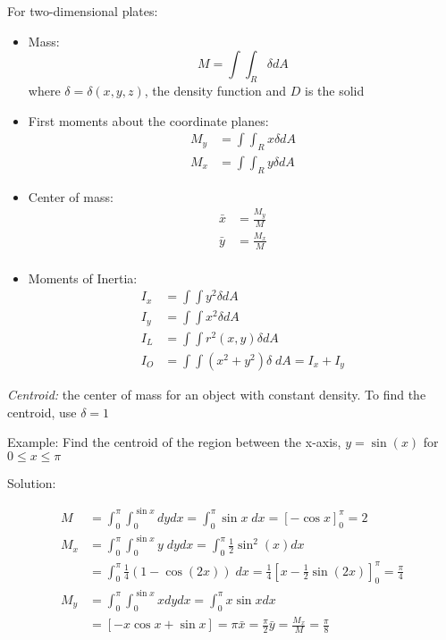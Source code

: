 \documentclass[12pt]{article}
\begin{document}
For two-dimensional plates:
\begin{itemize}
    \item Mass:
    \[M = \int \int_R \delta dA\]
    where $\delta = \delta(x,y,z)$, the density function and $D$ is the solid 
    \item First moments about the coordinate planes:
    \begin{align*}
        M_y &= \int \int_R x\delta dA\\
        M_x &= \int \int_R y \delta dA
    \end{align*}
    \item Center of mass:
    \begin{align*}
        \bar{x} &= \frac{M_y}{M}\\
        \bar{y} &= \frac{M_x}{M}\\
    \end{align*}
    \item Moments of Inertia:
    \begin{align*}
        I_x &= \int \int y^2 \delta dA\\
        I_y &= \int \int x^2 \delta dA\\
        I_L &= \int \int r^2(x,y) \delta dA\\
        I_O &= \int \int (x^2 + y^2) \delta \; dA = I_x + I_y
    \end{align*}
\end{itemize}

\emph{Centroid:} the center of mass for an object with constant density. To find the centroid, use $\delta = 1$ 

Example: Find the centroid of the region between the x-axis, $y=\sin (x)$ for $0\leq x \leq \pi$

Solution:

\begin{align*}
    M &= \int_0^\pi \int_0^{\sin x} dy dx = \int_0^\pi \sin x \; dx = \left[-\cos x\right]_0^\pi = 2\\
    M_x &= \int_0^\pi \int_0^{\sin x} y\; dy dx = \int_0^\pi \frac{1}{2} \sin^2 (x) dx\\
    &= \int_0^\pi \frac{1}{4} (1 - \cos(2x)) \; dx = \frac{1}{4} \left[x - \frac{1}{2} \sin (2x)\right]_0^\pi = \frac{\pi}{4}\\
    M_y &= \int_0^\pi \int_0^{\sin x} x dy dx = \int_0^\pi x \sin x dx\\
    &= \left[-x \cos x + \sin x\right] = \pi
    \bar{x} = \frac{\pi}{2}
    \bar{y} = \frac{M_x}{M} = \frac{\pi}{8}
\end{align*}
\end{document}
